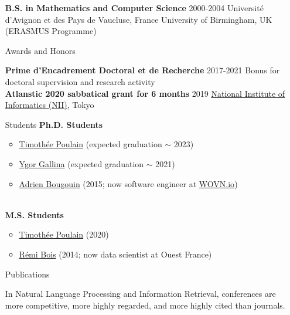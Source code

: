 \documentclass[11pt,a4paper]{article}
\begin{document}
\begin{itemize}
\textbf{B.S. in Mathematics and Computer Science} \hfill 2000-2004 \newline
Université d'Avignon et des Pays de Vaucluse, France \newline
University of Birmingham, UK (ERASMUS Programme)

\item[Awards and Honors]

\textbf{Prime d'Encadrement Doctoral et de Recherche} \hfill 2017-2021 \newline
Bonus for doctoral supervision and research activity \\[-.5cm]

\textbf{Atlanstic 2020 sabbatical grant for 6 months} \hfill 2019 \newline
\href{https://www.nii.ac.jp/en/}{National Institute of Informatics (NII)}, Tokyo


\item[Students]
\textbf{Ph.D. Students}
\begin{itemize}[nosep,topsep=-0.2cm,leftmargin=!,labelsep*=.3cm,label=$\Yright$]
\item \href{https://github.com/poulain-tim}{Timothée Poulain} (expected graduation $\sim$ 2023)
\item \href{https://github.com/ygorg}{Ygor Gallina}
      (expected graduation $\sim$ 2021) 
\item \href{http://adrien-bougouin.github.io/}{Adrien Bougouin} 
      (2015; now software engineer at \href{https://wovn.io/}{WOVN.io}) 
\end{itemize}~\\[-.2cm]
%
\textbf{M.S. Students}
\begin{itemize}[nosep,topsep=-0.2cm,leftmargin=!,labelsep*=.3cm,label=$\Yright$]
\item \href{https://github.com/poulain-tim}{Timothée Poulain} (2020)
\item \href{https://www.ledatablog.com/}{Rémi Bois} (2014; now data scientist at Ouest France) 
\end{itemize}

\item[Publications]

In Natural Language Processing and Information Retrieval, conferences are more 
competitive, more highly regarded, and more highly cited than journals.



\end{itemize}
\end{document}

